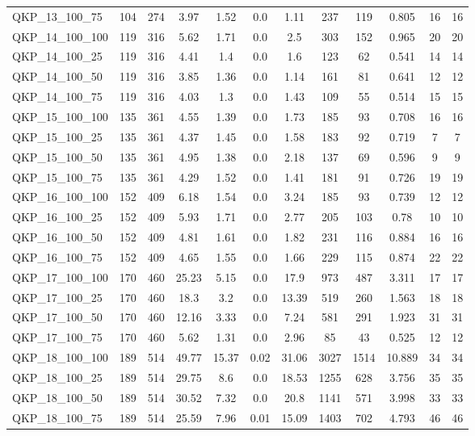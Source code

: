 \begin{table}[!h]
{\begin{tabular}{lccccccccccc}
QKP\_13\_100\_75 & 104 & 274 & 3.97 & 1.52 & 0.0 & 1.11 & 237 & 119 & 0.805 & 16 & 16\\
QKP\_14\_100\_100 & 119 & 316 & 5.62 & 1.71 & 0.0 & 2.5 & 303 & 152 & 0.965 & 20 & 20\\
QKP\_14\_100\_25 & 119 & 316 & 4.41 & 1.4 & 0.0 & 1.6 & 123 & 62 & 0.541 & 14 & 14\\
QKP\_14\_100\_50 & 119 & 316 & 3.85 & 1.36 & 0.0 & 1.14 & 161 & 81 & 0.641 & 12 & 12\\
QKP\_14\_100\_75 & 119 & 316 & 4.03 & 1.3 & 0.0 & 1.43 & 109 & 55 & 0.514 & 15 & 15\\
QKP\_15\_100\_100 & 135 & 361 & 4.55 & 1.39 & 0.0 & 1.73 & 185 & 93 & 0.708 & 16 & 16\\
QKP\_15\_100\_25 & 135 & 361 & 4.37 & 1.45 & 0.0 & 1.58 & 183 & 92 & 0.719 & 7 & 7\\
QKP\_15\_100\_50 & 135 & 361 & 4.95 & 1.38 & 0.0 & 2.18 & 137 & 69 & 0.596 & 9 & 9\\
QKP\_15\_100\_75 & 135 & 361 & 4.29 & 1.52 & 0.0 & 1.41 & 181 & 91 & 0.726 & 19 & 19\\
QKP\_16\_100\_100 & 152 & 409 & 6.18 & 1.54 & 0.0 & 3.24 & 185 & 93 & 0.739 & 12 & 12\\
QKP\_16\_100\_25 & 152 & 409 & 5.93 & 1.71 & 0.0 & 2.77 & 205 & 103 & 0.78 & 10 & 10\\
QKP\_16\_100\_50 & 152 & 409 & 4.81 & 1.61 & 0.0 & 1.82 & 231 & 116 & 0.884 & 16 & 16\\
QKP\_16\_100\_75 & 152 & 409 & 4.65 & 1.55 & 0.0 & 1.66 & 229 & 115 & 0.874 & 22 & 22\\
QKP\_17\_100\_100 & 170 & 460 & 25.23 & 5.15 & 0.0 & 17.9 & 973 & 487 & 3.311 & 17 & 17\\
QKP\_17\_100\_25 & 170 & 460 & 18.3 & 3.2 & 0.0 & 13.39 & 519 & 260 & 1.563 & 18 & 18\\
QKP\_17\_100\_50 & 170 & 460 & 12.16 & 3.33 & 0.0 & 7.24 & 581 & 291 & 1.923 & 31 & 31\\
QKP\_17\_100\_75 & 170 & 460 & 5.62 & 1.31 & 0.0 & 2.96 & 85 & 43 & 0.525 & 12 & 12\\
QKP\_18\_100\_100 & 189 & 514 & 49.77 & 15.37 & 0.02 & 31.06 & 3027 & 1514 & 10.889 & 34 & 34\\
QKP\_18\_100\_25 & 189 & 514 & 29.75 & 8.6 & 0.0 & 18.53 & 1255 & 628 & 3.756 & 35 & 35\\
QKP\_18\_100\_50 & 189 & 514 & 30.52 & 7.32 & 0.0 & 20.8 & 1141 & 571 & 3.998 & 33 & 33\\
QKP\_18\_100\_75 & 189 & 514 & 25.59 & 7.96 & 0.01 & 15.09 & 1403 & 702 & 4.793 & 46 & 46\\

\end{tabular}}
\end{table}
